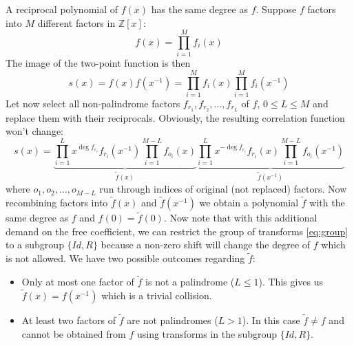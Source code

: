 \documentclass[12pt, a4paper]{article}
\begin{document}
A reciprocal polynomial of $f(x)$ has the same degree as $f$. Suppose $f$
factors into $M$ different factors in $\mathbb{Z}[x]$:
\begin{equation*}
  f(x) = \prod_{i=1}^M f_i(x)
\end{equation*}
The image of the two-point function is then
\begin{equation*}
  s(x) = f(x)f(x^{-1}) = \prod_{i=1}^M f_i(x) \prod_{i=1}^M f_i(x^{-1})
\end{equation*}
Let now select all non-palindrome factors $f_{r_1}, f_{r_2}, \dots, f_{r_L}$ of
$f$, $0 \le L \le M$ and replace them with their reciprocals. Obviously, the
resulting correlation function won't change:
\begin{equation*}
  s(x) = \underbrace{\prod_{i=1}^L x^{\deg f_{r_i}} f_{r_i}(x^{-1}) \prod_{i=1}^{M-L} f_{o_i}(x)}_{\tilde{f}(x)}
  \underbrace{\prod_{i=1}^L x^{-\deg f_{r_i}} f_{r_i}(x) \prod_{i=1}^{M-L} f_{o_i}(x^{-1})}_{\tilde{f}(x^{-1})}
\end{equation*}
where $o_1, o_2, \dots, o_{M-L}$ run through indices of original (not replaced)
factors. Now recombining factors into $\tilde{f}(x)$ and $\tilde{f}(x^{-1})$ we
obtain a polynomial $\tilde{f}$ with the same degree as $f$ and $f(0) = \tilde{f}(0)$.
Now note that with this additional demand on the free coefficient, we can
restrict the group of transforms \cref{eq:group} to a subgroup $\{Id, R\}$
because a non-zero shift will change the degree of $f$ which is not allowed. We
have two possible outcomes regarding $\tilde{f}$:
\begin{itemize}
\item Only at most one factor of $\tilde{f}$ is not a palindrome
  ($L \le 1$). This gives us $\tilde{f}(x) = f(x^{-1})$ which is a trivial
  collision.
\item At least two factors of $\tilde{f}$ are not palindromes ($L > 1$). In
  this case $\tilde{f} \ne f$ and cannot be obtained from $f$ using transforms
  in the subgroup $\{Id, R\}$.
\end{itemize}
\end{document}
